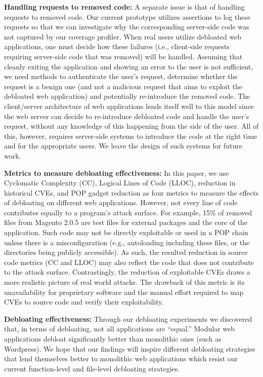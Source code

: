 \vspace{1ex}
\noindent\textbf{Handling requests to removed code:}
A separate issue is that of handling requests to removed code. Our
current prototype utilizes assertions to log these requests so that we can
investigate why the corresponding server-side code was not captured by our
coverage profiler. When real users utilize debloated web applications,
one must decide how these failures (i.e., client-side requests requiring
server-side code that was removed) will be handled. Assuming that cleanly
exiting the application and showing an error to the user is not sufficient,
we need methods to authenticate the user's request, determine whether the
request is a benign one (and not a malicious request that aims to exploit
the debloated web application) and potentially re-introduce the removed
code. The client/server architecture of web applications lends itself well
to this model since the web server can decide to re-introduce debloated code
and handle the user's request, without any knowledge of this happening from
the side of the user. All of this, however, requires server-side systems
to introduce the code at the right time and for the appropriate users. We
leave the design of such systems for future work.

\vspace{1ex}
\noindent\textbf{Metrics to measure debloating effectiveness:}
In this paper, we use Cyclomatic Complexity (CC), Logical Lines of Code
(LLOC), reduction in historical CVEs, and POP gadget reduction as four metrics to measure the
effects of debloating on different web applications. However, not every line of code
contributes equally to a program's attack surface. For example, 15\% of removed
files from Magento 2.0.5 are test files for external packages and
the core of the application. Such code may not be directly exploitable or
used in a POP chain unless there is a misconfiguration (e.g., autoloading
including these files, or the directories being publicly accessible). As such,
the resulted reduction in source code metrics (CC and LLOC) may also reflect the code
that does not contribute to the attack surface.
Contrastingly, the reduction of exploitable CVEs draws a more realistic picture
of real world attacks. The drawback of this metric is its unavailability for
proprietary software and the manual effort required to map CVEs to source
code and verify their exploitability.

\vspace{1ex}
\noindent\textbf{Debloating effectiveness:}
Through our debloating experiments we discovered that, in terms of debloating,
not all applications are ``equal.'' Modular web applications debloat
significantly better than monolithic ones (such as Wordpress). We hope that
our findings will inspire different debloating strategies that lend themselves
better to monolithic web applications which resist our current function-level
and file-level debloating strategies.




